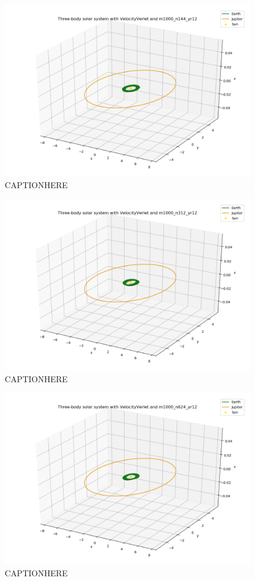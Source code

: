 \documentclass{article}
\begin{document}
    \begin{figure}[H]
        \centering
        \includegraphics[width = 11cm]{img/plot3D_S_E_J_V_m1000_n144_yr12.png}
        \caption{CAPTIONHERE}
        \label{fig:plot3D_S_E_J_V_m1000_n144_yr12}
    \end{figure}

    \begin{figure}[H]
        \centering
        \includegraphics[width = 11cm]{img/plot3D_S_E_J_V_m1000_n312_yr12.png}
        \caption{CAPTIONHERE}
        \label{fig:plot3D_S_E_J_V_m1000_n312_yr12}
    \end{figure}

    \begin{figure}[H]
        \centering
        \includegraphics[width = 11cm]{img/plot3D_S_E_J_V_m1000_n624_yr12.png}
        \caption{CAPTIONHERE}
        \label{fig:plot3D_S_E_J_V_m1000_n624_yr12}
    \end{figure}
\end{document}
